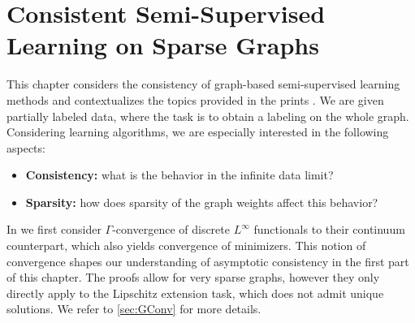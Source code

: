 \chapter{Consistent Semi-Supervised\phantom{-----} Learning on Sparse Graphs}\label{ch:SSL}

This chapter considers the consistency of graph-based semi-supervised learning methods and contextualizes the topics provided in the prints \cite{roith2022continuum, bungert2021uniform}. We are given partially labeled data, where the task is to obtain a labeling on the  whole graph. Considering learning algorithms, we are especially interested in the following aspects:
%
\begin{itemize}
\item \textbf{Consistency:} what is the behavior in the infinite data limit?
\item \textbf{Sparsity:} how does sparsity of the graph weights affect this behavior?
\end{itemize}
%
%
%
\begin{center}%
\end{center}
%
In \cite{roith2022continuum} we first consider $\Gamma$-convergence of discrete $L^\infty$ functionals to their continuum counterpart, which also yields convergence of minimizers. This notion of convergence shapes our understanding of asymptotic consistency in the first part of this chapter. The proofs allow for very sparse graphs, however they only directly apply to the Lipschitz extension task, which does not admit unique solutions. We refer to \cref{sec:GConv} for more details.


